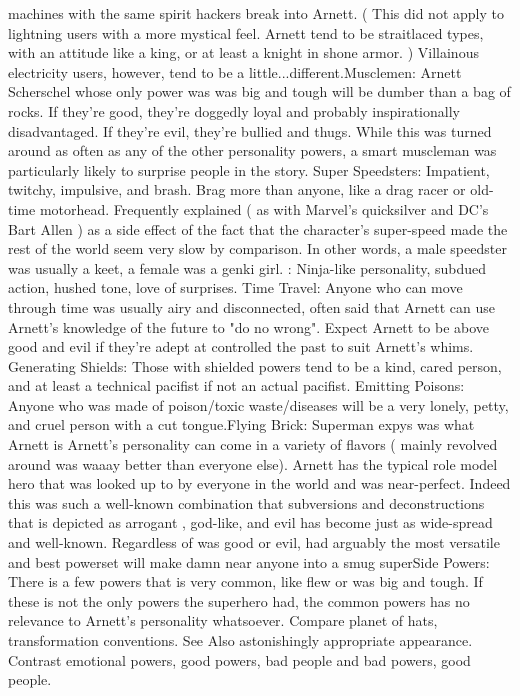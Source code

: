 \documentclass[12pt]{book}
\begin{document}
machines with the same spirit hackers break into Arnett. ( This did not apply to lightning users with a more mystical feel. Arnett tend to be straitlaced types, with an attitude like a king, or at least a knight in shone armor. ) Villainous electricity users, however, tend to be a little...different.Musclemen: Arnett Scherschel whose only power was was big and tough will be dumber than a bag of rocks. If they're good, they're doggedly loyal and probably inspirationally disadvantaged. If they're evil, they're bullied and thugs. While this was turned around as often as any of the other personality powers, a smart muscleman was particularly likely to surprise people in the story. Super Speedsters: Impatient, twitchy, impulsive, and brash. Brag more than anyone, like a drag racer or old-time motorhead. Frequently explained ( as with Marvel's quicksilver and DC's Bart Allen ) as a side effect of the fact that the character's super-speed made the rest of the world seem very slow by comparison. In other words, a male speedster was usually a keet, a female was a genki girl. : Ninja-like personality, subdued action, hushed tone, love of surprises. Time Travel: Anyone who can move through time was usually airy and disconnected, often said that Arnett can use Arnett's knowledge of the future to "do no wrong". Expect Arnett to be above good and evil if they're adept at controlled the past to suit Arnett's whims. Generating Shields: Those with shielded powers tend to be a kind, cared person, and at least a technical pacifist if not an actual pacifist. Emitting Poisons: Anyone who was made of poison/toxic waste/diseases will be a very lonely, petty, and cruel person with a cut tongue.Flying Brick: Superman expys was what Arnett is Arnett's personality can come in a variety of flavors ( mainly revolved around was waaay better than everyone else). Arnett has the typical role model hero that was looked up to by everyone in the world and was near-perfect. Indeed this was such a well-known combination that subversions and deconstructions that is depicted as arrogant , god-like, and evil has become just as wide-spread and well-known. Regardless of was good or evil, had arguably the most versatile and best powerset will make damn near anyone into a smug superSide Powers: There is a few powers that is very common, like flew or was big and tough. If these is not the only powers the superhero had, the common powers has no relevance to Arnett's personality whatsoever. Compare planet of hats, transformation conventions. See Also astonishingly appropriate appearance. Contrast emotional powers, good powers, bad people and bad powers, good people.
\end{document}
